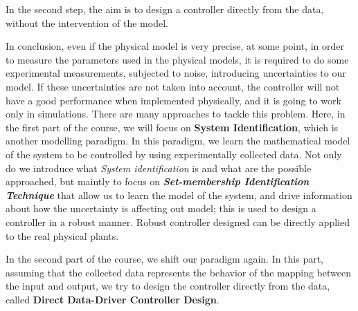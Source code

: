     In the second step, the aim is to design a controller directly from the data, without the intervention of the model.


\begin{factbox}

    In conclusion, even if the physical model is very precise, at some point, in order to measure the parameters used in the physical models, it is required to do some experimental measurements, subjected to noise, introducing uncertainties to our model.\newline \newline
    If these uncertainties are not taken into account, the controller will not have a good performance when implemented physically, and it is going to work only in simulations. \newline \newline
    There are many approaches to tackle this problem. Here, in the first part of the course, we will focus on \textbf{System Identification}, which is another modelling paradigm. In this paradigm, we learn the mathematical model of the system to be controlled by using experimentally collected data. Not only do we introduce what \textit{System identification} is and what are the possible approached, but maintly to focus on \textbf{\textit{Set-membership Identification Technique}} that allow us to learn the model of the system, and drive information about how the uncertainty is affecting out model; this is used to design a controller in a robust manner. Robust controller designed can be directly applied to the real physical plants.  \newline \newline
    
    In the second part of the course, we shift our paradigm again. In this part, assuming that the collected data represents the behavior of the mapping between the input and output, we try to design the controller directly from the data, called  \textbf{Direct Data-Driver Controller Design}. \newline \newline
    
\end{factbox}

